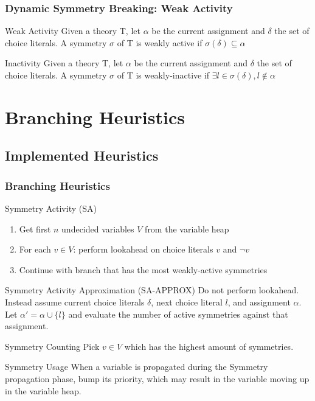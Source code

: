 \documentclass{beamer}
\begin{document}
	\begin{frame}
		\frametitle{Dynamic Symmetry Breaking: Weak Activity}

		\begin{block}{Weak Activity}
			Given a theory T, let $\alpha$ be the current assignment and $\delta$ the set of
			choice literals.
			A symmetry $\sigma$ of T is weakly active if $\sigma(\delta) \subseteq \alpha$
		\end{block}

		\begin{block}{Inactivity}
			Given a theory T, let $\alpha$ be the current assignment and $\delta$ the set of
			choice literals.
			A symmetry $\sigma$ of T is weakly-inactive if $\exists l \in \sigma(\delta), l \not\in \alpha$
		\end{block}
	\end{frame}

\section{Branching Heuristics}

	\subsection{Implemented Heuristics}
	\begin{frame}[allowframebreaks]
		\frametitle{Branching Heuristics}

		\begin{exampleblock}{Symmetry Activity (SA)}
			\begin{enumerate}
				\item Get first $n$ undecided variables $V$ from the variable heap
				\item For each $v \in V$: perform lookahead on choice literals $v$ and $\neg v$
				\item Continue with branch that has the most weakly-active symmetries
			\end{enumerate}
		\end{exampleblock}

		\begin{block}{Symmetry Activity Approximation (SA-APPROX)}
			Do not perform lookahead.
			Instead assume current choice literals $\delta$, next choice literal $l$, and assignment $\alpha$.
			Let $\alpha' = \alpha \cup \{l\}$ and evaluate the number of active symmetries against that assignment.
		\end{block}

		\begin{block}{Symmetry Counting}
			Pick $v \in V$ which has the highest amount of symmetries.
		\end{block}

		\begin{block}{Symmetry Usage}
			When a variable is propagated during the Symmetry propagation phase, bump its priority, which may result in the variable moving up in the variable heap.
		\end{block}
	\end{frame}
\end{document}
